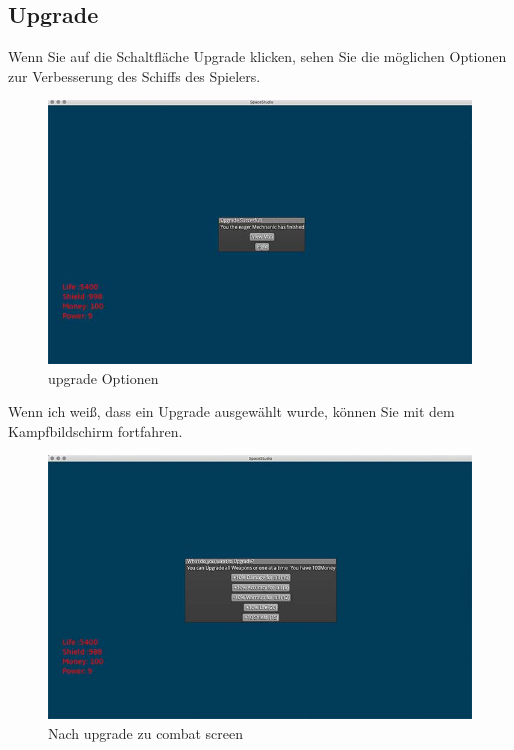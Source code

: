 \documentclass[12pt]{article}
\begin{document}
\subsection{Upgrade}
Wenn Sie auf die Schaltfläche Upgrade klicken, sehen Sie die möglichen Optionen zur Verbesserung des Schiffs des Spielers.
\begin{figure}[htp]
\centering
\includegraphics[scale=0.6]{TestProtocolBilder/nachupgrade@0,25x.jpg}
\caption{upgrade Optionen}
\end{figure}

Wenn ich weiß, dass ein Upgrade ausgewählt wurde, können Sie mit dem Kampfbildschirm fortfahren.
\begin{figure}[htp]
\centering
\includegraphics[scale=0.6]{TestProtocolBilder/upgrade@0,25x.jpg}
\caption{Nach upgrade zu combat screen }
\end{figure}
\end{document}

